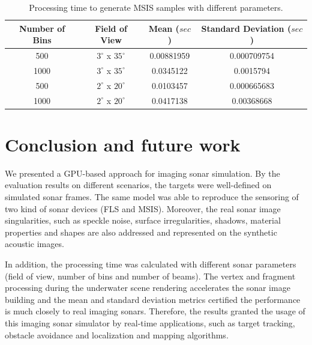 \documentclass[final,5p,times]{elsarticle}
\begin{document}
\begin{table}
    \caption{Processing time to generate MSIS samples with different parameters.}
    \label{table:msis}
    \begin{center}
        \begin{tabular}{| c | c | c | c |}
            \hline
            Number of Bins & Field of View & Mean ($sec$) & Standard Deviation ($sec$) \\
            \hline
            500       & $3^{\circ}$ x $35^{\circ}$        & 0.00881959	& 0.000709754  \\ \hline
            1000      & $3^{\circ}$ x $35^{\circ}$        & 0.0345122	& 0.0015794    \\ \hline
            500       & $2^{\circ}$ x $20^{\circ}$        & 0.0103457	& 0.000665683  \\ \hline
            1000      & $2^{\circ}$ x $20^{\circ}$        & 0.0417138	& 0.00368668   \\ \hline
        \end{tabular}
    \end{center}
\end{table}


\section{Conclusion and future work}
\label{conclusion}

We presented a GPU-based approach for imaging sonar simulation. By the evaluation results on different scenarios, the targets were well-defined on simulated sonar frames. The same model was able to reproduce the sensoring of two kind of sonar devices (FLS and MSIS). Moreover, the real sonar image singularities, such as speckle noise, surface irregularities, shadows, material properties and shapes are also addressed and represented on the synthetic acoustic images.

In addition, the processing time was calculated with different sonar parameters (field of view, number of bins and number of beams). The vertex and fragment processing during the underwater scene rendering accelerates the sonar image building and the mean and standard deviation metrics certified the performance is much closely to real imaging sonars. Therefore, the results granted the usage of this imaging sonar simulator by real-time applications, such as target tracking, obstacle avoidance and localization and mapping algorithms.
\end{document}
